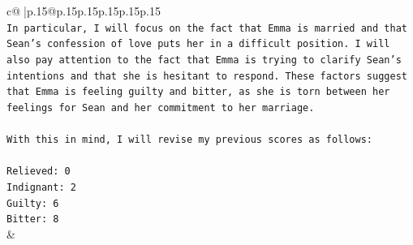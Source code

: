 \documentclass{article}
\begin{document}
{\begin{supertabular}{c@{$\;$}|p{.15\linewidth}@{}p{.15\linewidth}p{.15\linewidth}p{.15\linewidth}p{.15\linewidth}p{.15\linewidth}}
{{{\\ 
\texttt{In particular, I will focus on the fact that Emma is married and that Sean's confession of love puts her in a difficult position. I will also pay attention to the fact that Emma is trying to clarify Sean's intentions and that she is hesitant to respond. These factors suggest that Emma is feeling guilty and bitter, as she is torn between her feelings for Sean and her commitment to her marriage.} \\
\\ 
\texttt{With this in mind, I will revise my previous scores as follows:} \\
\\ 
\texttt{Relieved: 0} \\
\texttt{Indignant: 2} \\
\texttt{Guilty: 6} \\
\texttt{Bitter: 8} \\
            }
        }
    }
    & \\ \\

\end{supertabular}
}
\end{document}
